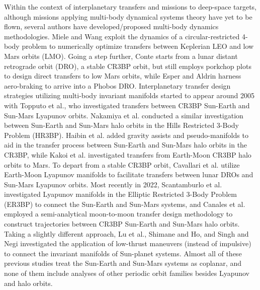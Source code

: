 Within the context of interplanetary transfers and missions to deep-space targets, although
missions applying multi-body dynamical systems theory have yet to be flown, several authors have
developed/proposed multi-body dynamics methodologies. Miele and Wang exploit the dynamics of a
circular-restricted 4-body problem to numerically optimize transfers between Keplerian LEO and low
Mars orbits (LMO)\cite{Miele:1999}. Going a step further, Conte starts from a lunar distant
retrograde orbit (DRO), a stable CR3BP orbit, but still employs porkchop plots to design direct
transfers to low Mars orbits\cite{Conte:2017}, while Esper and Aldrin harness aero-braking to
arrive into a Phobos DRO\cite{Esper:2019}. Interplanetary transfer design strategies utilizing
multi-body invariant manifolds started to appear around 2005 with Topputo et al., who investigated
transfers between CR3BP Sun-Earth and Sun-Mars Lyapunov orbits\cite{Topputo:2005}. Nakamiya et al.
conducted a similar investigation between Sun-Earth and Sun-Mars halo orbits in the Hills
Restricted 3-Body Problem (HR3BP)\cite{Nakamiya:2010}. Haibin et al. added gravity assists and
pseudo-manifolds to aid in the transfer process between Sun-Earth and Sun-Mars halo orbits in the
CR3BP\cite{Haibin:2014}, while Kakoi et al. investigated transfers from Earth-Moon CR3BP halo
orbits to Mars\cite{Kakoi:2014}. To depart from a stable CR3BP orbit, Cavallari et al. utilize
Earth-Moon Lyapunov manifolds to facilitate transfers between lunar DROs and Sun-Mars Lyapunov
orbits\cite{Cavallari:2019}. Most recently in 2022, Scantamburlo et al. investigated Lyapunov
manifolds in the Elliptic Restricted 3-Body Problem (ER3BP) to connect the Sun-Earth and Sun-Mars
systems\cite{Scantamburlo:2022}, and Canales et al. employed a semi-analytical moon-to-moon
transfer design methodology to construct trajectories between CR3BP Sun-Earth and Sun-Mars halo
orbits\cite{Canales:2021a,Canales:2022}. Taking a slightly different approach, Lu et
al.\cite{Lu:2015}, Shimane and Ho\cite{Shimane:2022}, and Singh and Negi\cite{Singh:2024}
investigated the application of low-thrust maneuvers (instead of impulsive) to connect the
invariant manifolds of Sun-planet systems. Almost all of these previous studies treat the Sun-Earth
and Sun-Mars systems as coplanar, and none of them include analyses of other periodic orbit
families besides Lyapunov and halo orbits.

